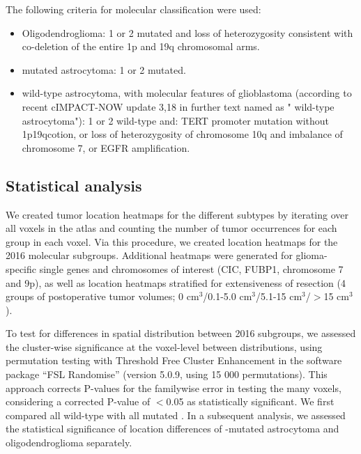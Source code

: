 The following criteria for molecular classification were used:

\begin{itemize}

\item Oligodendroglioma: 1 or 2 mutated and loss of heterozygosity consistent with co-deletion of the entire 1p and 19q chromosomal arms.

\item {} mutated astrocytoma: 1 or 2 mutated.

\item {} wild-type astrocytoma, with molecular features of glioblastoma (according to recent cIMPACT-NOW update 3,18  in further text named as " wild-type astrocytoma"): 1 or 2 wild-type and: TERT promoter mutation without \acl{1p19qcotion}, or loss of heterozygosity of chromosome 10q and imbalance of chromosome 7, or EGFR amplification.

\end{itemize}

\subsection{Statistical analysis}
We created tumor location heatmaps for the different  subtypes by iterating over all voxels in the  atlas and counting the number of tumor occurrences for each group in each voxel.
Via this procedure, we created location heatmaps for the  2016 molecular subgroups.
Additional heatmaps were generated for glioma-specific single genes and chromosomes of interest (CIC, FUBP1, chromosome 7 and 9p), as well as location heatmaps stratified for extensiveness of resection (4 groups of postoperative tumor volumes; 0 cm$^3$/0.1-5.0 cm$^3$/5.1-15 cm$^3$/$>$15 cm$^3$).

To test for differences in spatial distribution between  2016 subgroups, we assessed the cluster-wise significance at the voxel-level between distributions, using permutation testing with Threshold Free Cluster Enhancement in the software package “FSL Randomise” \autocite{winkler2014permutation} (version 5.0.9, using 15 000 permutations).
This approach corrects P-values for the familywise error in testing the many voxels, considering a corrected P-value of $<$0.05 as statistically significant.
We first compared all  wild-type  with all  mutated .
In a subsequent analysis, we assessed the statistical significance of location differences of -mutated astrocytoma and oligodendroglioma separately.


